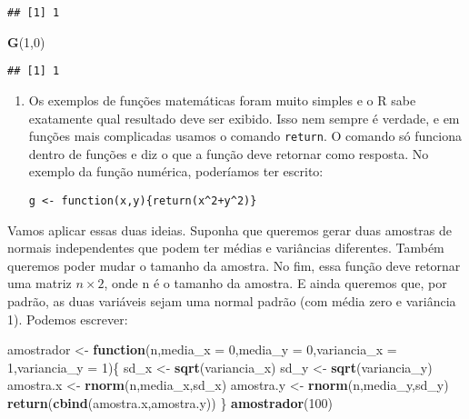 \documentclass[]{book}
\newenvironment{Shaded}{\begin{snugshade}}{\end{snugshade}}
\newcommand{\KeywordTok}[1]{\textcolor[rgb]{0.13,0.29,0.53}{\textbf{#1}}}
\newcommand{\DataTypeTok}[1]{\textcolor[rgb]{0.13,0.29,0.53}{#1}}
\newcommand{\DecValTok}[1]{\textcolor[rgb]{0.00,0.00,0.81}{#1}}
\newcommand{\StringTok}[1]{\textcolor[rgb]{0.31,0.60,0.02}{#1}}
\newcommand{\ControlFlowTok}[1]{\textcolor[rgb]{0.13,0.29,0.53}{\textbf{#1}}}
\newcommand{\NormalTok}[1]{#1}
\begin{document}
\begin{verbatim}
## [1] 1
\end{verbatim}

\begin{Shaded}
\begin{Highlighting}[]
\KeywordTok{G}\NormalTok{(}\DecValTok{1}\NormalTok{,}\DecValTok{0}\NormalTok{)}
\end{Highlighting}
\end{Shaded}

\begin{verbatim}
## [1] 1
\end{verbatim}

\begin{enumerate}
\def\labelenumi{(\arabic{enumi})}
\setcounter{enumi}{3}
\item
  Os exemplos de funções matemáticas foram muito simples e o R sabe
  exatamente qual resultado deve ser exibido. Isso nem sempre é verdade,
  e em funções mais complicadas usamos o comando \texttt{return}. O
  comando só funciona dentro de funções e diz o que a função deve
  retornar como resposta. No exemplo da função numérica, poderíamos ter
  escrito:

\begin{verbatim}
g <- function(x,y){return(x^2+y^2)}
\end{verbatim}
\end{enumerate}

Vamos aplicar essas duas ideias. Suponha que queremos gerar duas
amostras de normais independentes que podem ter médias e variâncias
diferentes. Também queremos poder mudar o tamanho da amostra. No fim,
essa função deve retornar uma matriz \(n \times 2\), onde n é o tamanho
da amostra. E ainda queremos que, por padrão, as duas variáveis sejam
uma normal padrão (com média zero e variância 1). Podemos escrever:

\begin{Shaded}
\begin{Highlighting}[]
\NormalTok{amostrador <-}\StringTok{ }\ControlFlowTok{function}\NormalTok{(n,}\DataTypeTok{media_x =} \DecValTok{0}\NormalTok{,}\DataTypeTok{media_y =} \DecValTok{0}\NormalTok{,}\DataTypeTok{variancia_x =} \DecValTok{1}\NormalTok{,}\DataTypeTok{variancia_y =} \DecValTok{1}\NormalTok{)\{}
\NormalTok{sd_x <-}\StringTok{ }\KeywordTok{sqrt}\NormalTok{(variancia_x)}
\NormalTok{sd_y <-}\StringTok{ }\KeywordTok{sqrt}\NormalTok{(variancia_y)}
\NormalTok{amostra.x <-}\StringTok{ }\KeywordTok{rnorm}\NormalTok{(n,media_x,sd_x)}
\NormalTok{amostra.y <-}\StringTok{ }\KeywordTok{rnorm}\NormalTok{(n,media_y,sd_y)}
\KeywordTok{return}\NormalTok{(}\KeywordTok{cbind}\NormalTok{(amostra.x,amostra.y))}
\NormalTok{\}}
\KeywordTok{amostrador}\NormalTok{(}\DecValTok{100}\NormalTok{)}
\end{Highlighting}
\end{Shaded}
\end{document}
